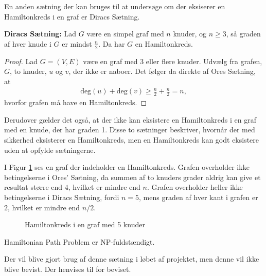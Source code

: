 En anden sætning der kan bruges til at undersøge om der eksiserer en Hamiltonkreds i en graf er Diracs Sætning. 

\begin{thm} \label{diracs_thm}
	\textbf{Diracs Sætning:} 
	Lad $G$ være en simpel graf med $n$ knuder, og $n\geq3$, så graden af hver knude i $G$ er mindst $\frac{n}{2}$. Da har $G$ en Hamiltonkreds.  
\end{thm}

\begin{proof}
	Lad $G=(V,E)$ være en graf med 3 eller flere knuder. Udvælg fra grafen, $G$, to knuder, $u$ og $v$, der ikke er naboer. Det følger da direkte af Ores Sætning, at
	\begin{align*}
	\textrm{deg}(u) + \textrm{deg}(v) \geq \frac{n}{2} + \frac{n}{2} = n,
	\end{align*}
	hvorfor grafen må have en Hamiltonkreds.
\end{proof}

Derudover gælder det også, at der ikke kan eksistere en Hamiltonkreds i en graf med en knude, der har graden 1. 
Disse to sætninger beskriver, hvornår der med sikkerhed eksisterer en Hamiltonkreds, men en Hamiltonkreds kan godt eksistere uden at opfylde sætningerne. 

\begin{exmp}
	I Figur \ref{pentagon} ses en graf der indeholder en Hamiltonkreds.
	Grafen overholder ikke betingelserne i Ores' Sætning, da summen af to knuders grader aldrig kan give et resultat større end $4$, hvilket er mindre end $n$.
	Grafen overholder heller ikke betingelserne i Diracs Sætning, fordi $n=5$, mens graden af hver kant i grafen er $2$, hvilket er mindre end $n/2$.
	
	\begin{figure}[h]
	\centering
		
	\caption{Hamiltonkreds i en graf med 5 knuder}
	\label{pentagon}
	\end{figure}
\end{exmp}

\begin{thm} \label{HPP}
	Hamiltonian Path Problem er NP-fuldstændigt. \citep{computers}
\end{thm}

Der vil blive gjort brug af denne sætning i løbet af projektet, men denne vil ikke blive bevist. 
Der henvises til \citep{computers} for beviset.
